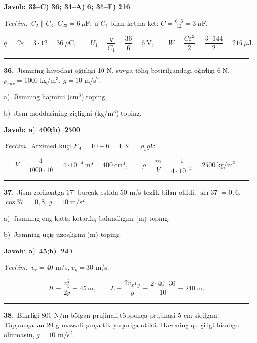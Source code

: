 \documentclass[11pt,a4paper]{article}
\begin{document}
\noindent\colorbox{gray!12}{\parbox{\dimexpr\linewidth-2\fboxsep}{\textbf{Javob: 33--C) 36; 34--A) 6; 35--F) 216}}}\par\smallskip
\noindent\textit{Yechim.}\ $C_2\parallel C_3$: $C_{23}=6\ \mu$F; u $C_1$ bilan ketma-ket: $C=\frac{6\cdot6}{12}=3\ \mu$F.\par
\[q=C\varepsilon=3\cdot12=36\ \mu\text{C},\qquad U_1=\frac{q}{C_1}=\frac{36}{6}=6\ \text{V},\qquad W=\frac{C\varepsilon^2}{2}=\frac{3\cdot144}{2}=216\ \mu\text{J}.\]\par\medskip\hrule\medskip
{}\noindent\textbf{36.}\ Jismning havodagi oğirligi 10 N, suvga töliq botirilgandagi oğirligi 6 N. $\rho_{suv}=1000$ kg/m$^3$, $g=10$ m/s$^2$.\par
\noindent\hspace*{4mm}a)\ Jismning hajmini (cm$^3$) toping.\par
\noindent\hspace*{4mm}b)\ Jism moddasining ziçligini (kg/m$^3$) toping.\par
\noindent\colorbox{gray!12}{\parbox{\dimexpr\linewidth-2\fboxsep}{\textbf{Javob: a)\ 400;\quad b)\ 2500}}}\par\smallskip
\noindent\textit{Yechim.}\ Arximed kuçi $F_A=10-6=4$ N $=\rho_s gV$:\par
\[V=\frac{4}{1000\cdot10}=4\cdot10^{-4}\ \text{m}^3=400\ \text{cm}^3,\qquad \rho=\frac{m}{V}=\frac{1}{4\cdot10^{-4}}=2500\ \text{kg/m}^3.\]\par\medskip\hrule\medskip
{}\noindent\textbf{37.}\ Jism gorizontga $37^\circ$ burçak ostida 50 m/s tezlik bilan otildi. $\sin37^\circ=0{,}6$, $\cos37^\circ=0{,}8$, $g=10$ m/s$^2$.\par
\noindent\hspace*{4mm}a)\ Jismning eng katta kötariliş balandligini (m) toping.\par
\noindent\hspace*{4mm}b)\ Jismning uçiş uzoqligini (m) toping.\par
\noindent\colorbox{gray!12}{\parbox{\dimexpr\linewidth-2\fboxsep}{\textbf{Javob: a)\ 45;\quad b)\ 240}}}\par\smallskip
\noindent\textit{Yechim.}\ $v_x=40$ m/s, $v_y=30$ m/s.\par
\[H=\frac{v_y^2}{2g}=45\ \text{m},\qquad L=\frac{2v_xv_y}{g}=\frac{2\cdot40\cdot30}{10}=240\ \text{m}.\]\par\medskip\hrule\medskip
{}\noindent\textbf{38.}\ Bikrligi 800 N/m bölgan prujinali töpponça prujinasi 5 cm siqilgan. Töpponçadan 20 g massali şarça tik yuqoriga otildi. Havoning qarşiligi hisobga olinmasin, $g=10$ m/s$^2$.\par
\end{document}
